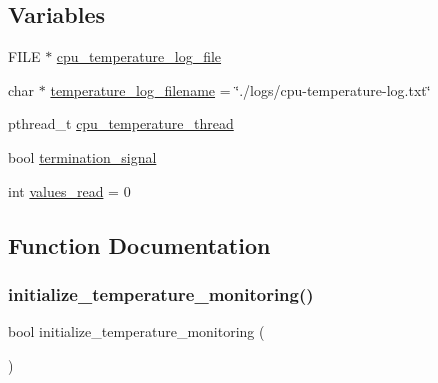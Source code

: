 \subsection*{Variables}
\begin{DoxyCompactItemize}
\item 
F\+I\+LE $\ast$ \hyperlink{temperature-monitoring_8c_a3eba6c975c7682ba69326ead52138c22}{cpu\+\_\+temperature\+\_\+log\+\_\+file}
\item 
char $\ast$ \hyperlink{temperature-monitoring_8c_a56a6f9c0952e2df3ad4350f699f92c69}{temperature\+\_\+log\+\_\+filename} = \char`\"{}./logs/cpu-\/temperature-\/log.\+txt\char`\"{}
\item 
pthread\+\_\+t \hyperlink{temperature-monitoring_8c_a0779eaf59a5b5aa820ba928ecf085898}{cpu\+\_\+temperature\+\_\+thread}
\item 
bool \hyperlink{temperature-monitoring_8c_a8816032420cadc4240ed8fe9a52e72b9}{termination\+\_\+signal}
\item 
int \hyperlink{temperature-monitoring_8c_a1505e02e191e96ec836e1e22c8d4cdb6}{values\+\_\+read} = 0
\end{DoxyCompactItemize}


\subsection{Function Documentation}
\mbox{\label{temperature-monitoring_8c_a1d2bab81a3e6aa84eb0c2e0172594299}} 
\subsubsection{\texorpdfstring{initialize\+\_\+temperature\+\_\+monitoring()}{initialize\_temperature\_monitoring()}}
{\footnotesize\ttfamily bool initialize\+\_\+temperature\+\_\+monitoring (\begin{DoxyParamCaption}{ }\end{DoxyParamCaption})}

